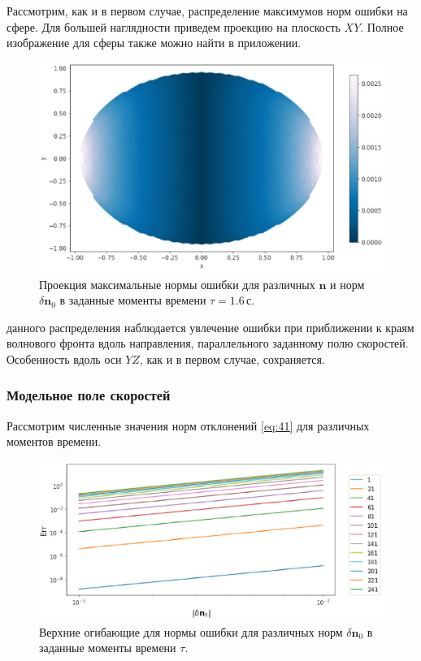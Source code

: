 \documentclass[12pt, cleqn, a4paper]{article}
\newcommand{\bfv}[1]{\mathbf{#1}}
\newcommand{\dn}{\delta \bfv{n}}
\begin{document}
Рассмотрим, как и в первом случае, распределение максимумов норм ошибки на сфере. Для большей наглядности приведем проекцию на плоскость $XY$. Полное изображение для сферы также можно найти в приложении.
\begin{figure}[H] 
\centering
\includegraphics[width=1.0\linewidth]{proj_grad_lin.eps}
\caption{Проекция максимальные нормы ошибки для различных $\bfv{n}$ и норм $\dn_0$ в заданные моменты времени $\tau = 1.6$\,с.}
\label{fig:proj_grad_lin}
\end{figure}

 данного распределения наблюдается увлечение ошибки при приближении к краям волнового фронта вдоль направления, параллельного заданному полю скоростей. Особенность вдоль оси $YZ$, как и в первом случае, сохраняется.\\


\subsubsection{Модельное поле скоростей}
Рассмотрим численные значения норм отклонений \eqref{eq:41} для различных моментов времени.
\begin{figure}[H] 
\centering
\includegraphics[width=1.0\linewidth]{errline_gauss.eps}
\caption{Верхние огибающие для нормы ошибки для различных норм $\dn_0$ в заданные моменты времени $\tau$.}
\label{fig:errline_gauss}
\end{figure}
\end{document}
